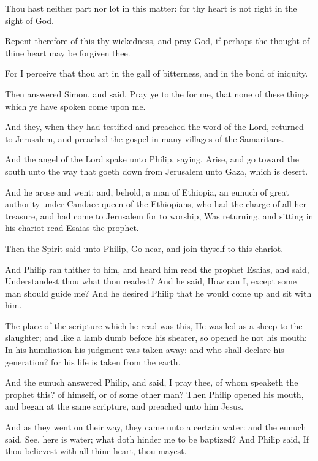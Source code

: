 \Verse Thou hast neither part nor lot in this matter: for thy heart is not right in the sight of God.

\Verse Repent therefore of this thy wickedness, and pray God, if perhaps the thought of thine heart may be forgiven thee.

\Verse For I perceive that thou art in the gall of bitterness, and in the bond of iniquity.

\Verse Then answered Simon, and said, Pray ye to the \LORD for me, that none of these things which ye have spoken come upon me.

\Verse And they, when they had testified and preached the word of the Lord, returned to Jerusalem, and preached the gospel in many villages of the Samaritans.

\Verse And the angel of the Lord spake unto Philip, saying, Arise, and go toward the south unto the way that goeth down from Jerusalem unto Gaza, which is desert.

\Verse And he arose and went: and, behold, a man of Ethiopia, an eunuch of great authority under Candace queen of the Ethiopians, who had the charge of all her treasure, and had come to Jerusalem for to worship, \Verse Was returning, and sitting in his chariot read Esaias the prophet.

\Verse Then the Spirit said unto Philip, Go near, and join thyself to this chariot.

\Verse And Philip ran thither to him, and heard him read the prophet Esaias, and said, Understandest thou what thou readest?  \Verse And he said, How can I, except some man should guide me? And he desired Philip that he would come up and sit with him.

\Verse The place of the scripture which he read was this, He was led as a sheep to the slaughter; and like a lamb dumb before his shearer, so opened he not his mouth: \Verse In his humiliation his judgment was taken away: and who shall declare his generation? for his life is taken from the earth.

\Verse And the eunuch answered Philip, and said, I pray thee, of whom speaketh the prophet this? of himself, or of some other man?  \Verse Then Philip opened his mouth, and began at the same scripture, and preached unto him Jesus.

\Verse And as they went on their way, they came unto a certain water: and the eunuch said, See, here is water; what doth hinder me to be baptized?  \Verse And Philip said, If thou believest with all thine heart, thou mayest.

